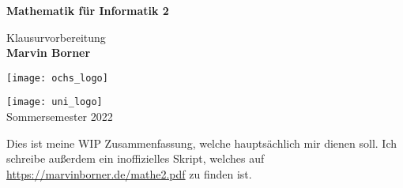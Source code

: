 \begin{titlepage}
	\begin{center}
		\vspace*{1cm}

		{\huge\textbf{Mathematik für Informatik 2}}

		\vspace{0.5cm}
		{\Large Klausurvorbereitung}\\
		\textbf{Marvin Borner}

		\vfill
		\texttt{[image: ochs\_logo]}\\
		\vfill

		\texttt{[image: uni\_logo]}\\
		Sommersemester 2022
	\end{center}
\end{titlepage}

\pagebreak\hspace{0pt}\vfill\begin{center}{\Large Dies ist meine WIP Zusammenfassung, welche hauptsächlich mir dienen soll. Ich schreibe außerdem ein inoffizielles Skript, welches auf \url{https://marvinborner.de/mathe2.pdf} zu finden ist.}\end{center}\vfill\hspace{0pt}\pagebreak
